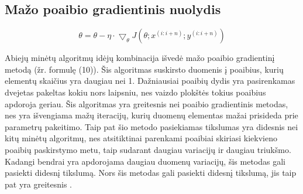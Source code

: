 \documentclass{VUMIFInfKursinis}
\begin{document}
\subsection{Mažo poaibio gradientinis nuolydis}
\begin{equation}
\theta = \theta - \eta \cdot \bigtriangledown_{\theta}J(\theta;x^{(i:i+n)};y^{(i:i+n)})
\end{equation}
\par
Abiejų minėtų algoritmų idėjų kombinacija išvedė mažo poaibio gradientinį metodą (žr. formulę (10)).
Šis algoritmas suskirsto duomenis į poaibius, kurių elementų skaičius yra daugiau nei 1.
Dažniausiai poaibių dydis yra pasirenkamas dvejetas pakeltas kokiu nors laipsniu, nes
vaizdo plokštės tokius poaibius apdoroja geriau. Šis algoritmas yra greitesnis nei poaibio
gradientinis metodas, nes yra išvengiama mažų iteracijų, kurių duomenų elementas mažai
prisideda prie parametrų pakeitimo. Taip pat šio metodo pasiekiamas tikslumas yra didesnis
nei kitų minėtų algoritmų, nes atsitiktinai parenkami poaibiai skiriasi kiekvieno
poaibių paskirstymo metu, taip sudarant daugiau variacijų ir daugiau triukšmo. Kadangi
bendrai yra apdorojama daugiau duomenų variacijų, šis metodas gali pasiekti didesnį
tikslumą. Nors šis metodas gali pasiekti didesnį tikslumą, jis taip pat yra greitesnis \cite{salt9}.

\end{document}
